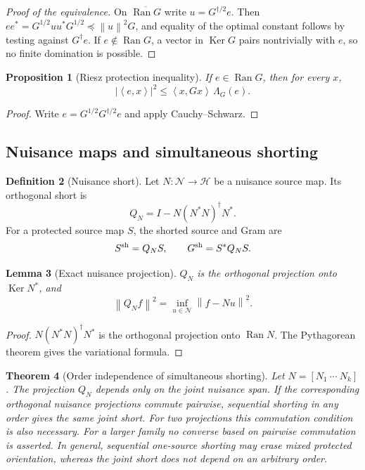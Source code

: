 \documentclass[11pt]{article}
\newtheorem{theorem}{Theorem}[section]
\newtheorem{proposition}[theorem]{Proposition}
\newtheorem{lemma}[theorem]{Lemma}
\theoremstyle{definition}
\newtheorem{definition}[theorem]{Definition}
\theoremstyle{remark}
\newcommand{\Ker}{\operatorname{Ker}}
\newcommand{\Ran}{\operatorname{Ran}}
\newcommand{\norm}[1]{\left\lVert#1\right\rVert}
\newcommand{\abs}[1]{\left\lvert#1\right\rvert}
\newcommand{\ip}[2]{\left\langle#1,#2\right\rangle}
\begin{document}
\begin{proof}[Proof of the equivalence]
On $\overline{\Ran G}$ write $u=G^{\dagger/2}e$.  Then
$ee^*=G^{1/2}uu^*G^{1/2}\preceq\norm{u}^2G$, and equality of the optimal
constant follows by testing against $G^\dagger e$.  If $e\notin\Ran G$, a
vector in $\Ker G$ pairs nontrivially with $e$, so no finite domination is
possible.
\end{proof}

\begin{proposition}[Riesz protection inequality]
\label{prop:gran-riesz}
If $e\in\Ran G$, then for every $x$,
\[
 \abs{\ip{e}{x}}^2
 \le \ip{x}{Gx}\,\Lambda_G(e).
\]
\end{proposition}

\begin{proof}
Write $e=G^{1/2}G^{\dagger/2}e$ and apply Cauchy--Schwarz.
\end{proof}

\subsection{Nuisance maps and simultaneous shorting}

\begin{definition}[Nuisance short]
Let $N:\mathcal N\to\widehat{\mathcal H}$ be a nuisance source map.  Its
orthogonal short is
\[
 Q_N=I-N(N^*N)^\dagger N^*.
\]
For a protected source map $S$, the shorted source and Gram are
\[
 S^{\rm sh}=Q_NS,
 \qquad
 G^{\rm sh}=S^*Q_NS.
\]
\end{definition}

\begin{lemma}[Exact nuisance projection]
$Q_N$ is the orthogonal projection onto $\Ker N^*$, and
\[
 \norm{Q_Nf}^2
 =\inf_{u\in\mathcal N}\norm{f-Nu}^2.
\]
\end{lemma}

\begin{proof}
$N(N^*N)^\dagger N^*$ is the orthogonal projection onto $\Ran N$.
The Pythagorean theorem gives the variational formula.
\end{proof}

\begin{theorem}[Order independence of simultaneous shorting]
\label{thm:simultaneous-short}
Let $N=[N_1\ \cdots\ N_k]$.  The projection $Q_N$ depends only on the joint
nuisance span.  If the corresponding orthogonal nuisance projections commute
pairwise, sequential shorting in any order gives the same joint short.
For two projections this commutation condition is also necessary.  For a
larger family no converse based on pairwise commutation is asserted.
In general, sequential one-source shorting may erase mixed protected
orientation, whereas the joint short does not depend on an arbitrary order.
\end{theorem}
\end{document}
